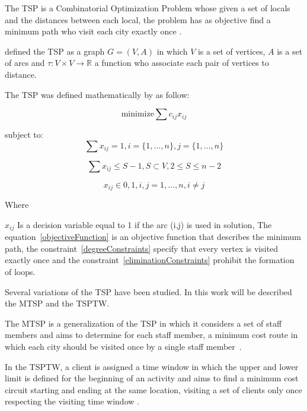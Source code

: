 The \ac{TSP} is a Combinatorial Optimization Problem whose given a set of locals and the distances between each local, the problem has as objective find a minimum path who visit each city exactly once .

 defined the \ac{TSP} as a graph $G = (V,A)$ in which $V$ is a set of vertices, $A$ is a set of arcs and $\tau:V\times V \rightarrow \mathds{R}$  a function who associate each pair of vertices to distance.  

The  \ac{TSP} was defined mathematically by  as follow:

\begin{equation}\label{objectiveFunction}
\mbox{minimize} \sum{c_{ij}x_{ij}}
\end{equation}

subject to: \\

\begin{equation}\label{degreeConstraints}
 \sum{x_{ij}} = 1, i = \{1, \ldots, n\}, j = \{1, \ldots, n\}
\end{equation}

\begin{equation}\label{eliminationConstraints}
 \sum{x_{ij}} \leqslant S - 1, S \subset V, 2 \leqslant S \leqslant n - 2
\end{equation}

\begin{equation}
x_{ij} \in {0,1},
i,j = 1, \ldots, n, 
i \neq j
\end{equation}

Where

$x_{ij}$ Is a decision variable equal to 1 if the arc (i,j) is used in solution,
The equation~\ref{objectiveFunction} is an objective function that describes the minimum path,
the constraint~\ref{degreeConstraints} specify that every vertex is visited exactly once and
the constraint~\ref{eliminationConstraints} prohibit the formation of loops.

Several variations of the \ac{TSP} have been studied. In this work will be described the \ac{MTSP} and the \ac{TSPTW}. 

The \acl{MTSP} is a generalization of the \ac{TSP} in which it considers a set of staff members and aims to determine for each staff member, a minimum cost route in which each city should be visited once by a single staff member~\cite{meng:2012}.

In the \acl{TSPTW}, a client is assigned a time window in which the upper and lower limit is defined for the beginning of an activity and aims to find a minimum cost circuit starting and ending at the same location, visiting a set of clients only once respecting the visiting time window \cite{urrutia:2010}.

